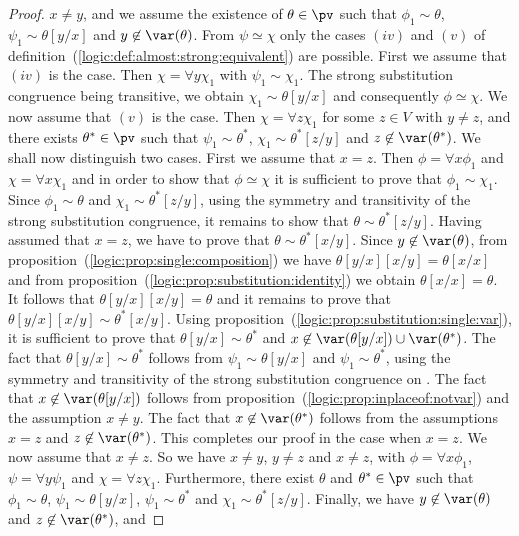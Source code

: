 \begin{proof}
$x\neq y$, and we assume the existence of $\theta\in\pv$ such that
$\phi_{1}\sim\theta$, $\psi_{1}\sim\theta[y/x]$ and
$y\not\in\var(\theta)$. From $\psi\simeq\chi$ only the cases $(iv)$
and $(v)$ of definition~(\ref{logic:def:almost:strong:equivalent})
are possible. First we assume that $(iv)$ is the case. Then
$\chi=\forall y\chi_{1}$ with $\psi_{1}\sim\chi_{1}$. The strong
substitution congruence being transitive, we obtain
$\chi_{1}\sim\theta[y/x]$ and consequently $\phi\simeq\chi$. We now
assume that $(v)$ is the case. Then $\chi=\forall z\chi_{1}$ for
some $z\in V$ with $y\neq z$, and there exists $\theta^{*}\in\pv$
such that $\psi_{1}\sim\theta^{*}$, $\chi_{1}\sim\theta^{*}[z/y]$
and $z\not\in\var(\theta^{*})$. We shall now distinguish two cases.
First we assume that $x=z$. Then $\phi=\forall x\phi_{1}$ and
$\chi=\forall x\chi_{1}$ and in order to show that $\phi\simeq\chi$
it is sufficient to prove that $\phi_{1}\sim\chi_{1}$. Since
$\phi_{1}\sim\theta$ and $\chi_{1}\sim\theta^{*}[z/y]$, using the
symmetry and transitivity of the strong substitution congruence, it
remains to show that $\theta\sim\theta^{*}[z/y]$. Having assumed
that $x=z$, we have to prove that $\theta\sim\theta^{*}[x/y]$. Since
$y\not\in\var(\theta)$, from
proposition~(\ref{logic:prop:single:composition}) we have
$\theta[y/x][x/y]=\theta[x/x]$ and from
proposition~(\ref{logic:prop:substitution:identity}) we obtain
$\theta[x/x]=\theta$. It follows that $\theta[y/x][x/y]=\theta$ and
it remains to prove that $\theta[y/x][x/y]\sim\theta^{*}[x/y]$.
Using proposition~(\ref{logic:prop:substitution:single:var}), it is
sufficient to prove that $\theta[y/x]\sim\theta^{*}$ and
$x\not\in\var(\theta[y/x])\cup\var(\theta^{*})$. The fact that
$\theta[y/x]\sim\theta^{*}$ follows from $\psi_{1}\sim\theta[y/x]$
and $\psi_{1}\sim\theta^{*}$, using the symmetry and transitivity of
the strong substitution congruence on \pv. The fact that
$x\not\in\var(\theta[y/x])$ follows from
proposition~(\ref{logic:prop:inplaceof:notvar}) and the assumption
$x\neq y$. The fact that $x\not\in\var(\theta^{*})$ follows from the
assumptions $x=z$ and $z\not\in\var(\theta^{*})$. This completes our
proof in the case when $x=z$. We now assume that $x\neq z$. So we
have $x\neq y$, $y\neq z$ and $x\neq z$, with $\phi=\forall
x\phi_{1}$, $\psi=\forall y\psi_{1}$ and $\chi=\forall z\chi_{1}$.
Furthermore, there exist $\theta$ and $\theta^{*}\in\pv$ such that
$\phi_{1}\sim\theta$, $\psi_{1}\sim\theta[y/x]$,
$\psi_{1}\sim\theta^{*}$ and $\chi_{1}\sim\theta^{*}[z/y]$. Finally,
we have $y\not\in\var(\theta)$ and $z\not\in\var(\theta^{*})$, and

\end{proof}
